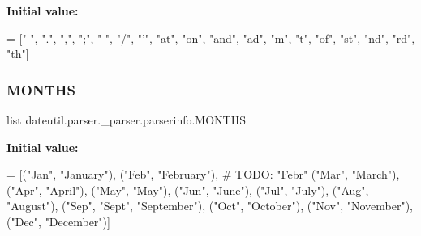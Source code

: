 {\bfseries Initial value\+:}
\begin{DoxyCode}
=  [\textcolor{stringliteral}{" "}, \textcolor{stringliteral}{"."}, \textcolor{stringliteral}{","}, \textcolor{stringliteral}{";"}, \textcolor{stringliteral}{"-"}, \textcolor{stringliteral}{"/"}, \textcolor{stringliteral}{"'"},
            \textcolor{stringliteral}{"at"}, \textcolor{stringliteral}{"on"}, \textcolor{stringliteral}{"and"}, \textcolor{stringliteral}{"ad"}, \textcolor{stringliteral}{"m"}, \textcolor{stringliteral}{"t"}, \textcolor{stringliteral}{"of"},
            \textcolor{stringliteral}{"st"}, \textcolor{stringliteral}{"nd"}, \textcolor{stringliteral}{"rd"}, \textcolor{stringliteral}{"th"}]
\end{DoxyCode}
\mbox{\label{classdateutil_1_1parser_1_1__parser_1_1parserinfo_acf321dcd5ad2b5c0e8a0af6c7054ee88}} 
\subsubsection{\texorpdfstring{M\+O\+N\+T\+HS}{MONTHS}}
{\footnotesize\ttfamily list dateutil.\+parser.\+\_\+parser.\+parserinfo.\+M\+O\+N\+T\+HS\hspace{0.3cm}{\ttfamily [static]}}

{\bfseries Initial value\+:}
\begin{DoxyCode}
=  [(\textcolor{stringliteral}{"Jan"}, \textcolor{stringliteral}{"January"}),
              (\textcolor{stringliteral}{"Feb"}, \textcolor{stringliteral}{"February"}),      \textcolor{comment}{# TODO: "Febr"}
              (\textcolor{stringliteral}{"Mar"}, \textcolor{stringliteral}{"March"}),
              (\textcolor{stringliteral}{"Apr"}, \textcolor{stringliteral}{"April"}),
              (\textcolor{stringliteral}{"May"}, \textcolor{stringliteral}{"May"}),
              (\textcolor{stringliteral}{"Jun"}, \textcolor{stringliteral}{"June"}),
              (\textcolor{stringliteral}{"Jul"}, \textcolor{stringliteral}{"July"}),
              (\textcolor{stringliteral}{"Aug"}, \textcolor{stringliteral}{"August"}),
              (\textcolor{stringliteral}{"Sep"}, \textcolor{stringliteral}{"Sept"}, \textcolor{stringliteral}{"September"}),
              (\textcolor{stringliteral}{"Oct"}, \textcolor{stringliteral}{"October"}),
              (\textcolor{stringliteral}{"Nov"}, \textcolor{stringliteral}{"November"}),
              (\textcolor{stringliteral}{"Dec"}, \textcolor{stringliteral}{"December"})]
\end{DoxyCode}
\mbox{\label{classdateutil_1_1parser_1_1__parser_1_1parserinfo_a8f664f7f905f30e4cb1d3b97337eb6d2}} 
